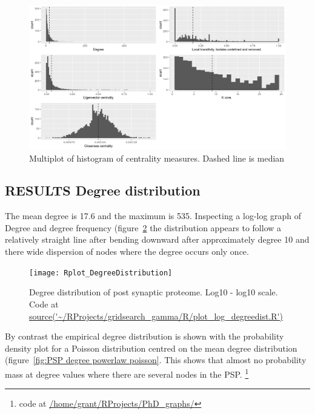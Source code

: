 \begin{figure}
    \centering
    \includegraphics[width=\textwidth]{images/Rplot_histogram_centralities.png}
    \caption{Multiplot of histogram of centrality measures. Dashed line is median}
    \label{fig:multiplot centralities}
\end{figure}

\subsection{RESULTS Degree distribution}

The mean degree is 17.6 and the maximum is 535. Inspecting a log-log graph of Degree and degree frequency (figure~\ref{fig:Degree distribution of post synaptic proteome. Log10 - log10 scale.} the distribution appears to follow a relatively straight line after bending downward after approximately degree 10 and there wide dispersion of nodes where the degree occurs only once.

\begin{figure}
    \texttt{[image: Rplot\_DegreeDistribution]}
    \caption{Degree distribution of post synaptic proteome. Log10 - log10 scale. Code at \url{source('~/RProjects/gridsearch_gamma/R/plot_log_degreedist.R') }}
    \label{fig:Degree distribution of post synaptic proteome. Log10 - log10 scale.}
\end{figure}
By contrast the empirical degree distribution is shown with the probability density plot for a Poisson distribution centred on the mean degree distribution (figure~\ref{fig:PSP degree powerlaw poisson}. This shows that almost no probability mass at degree values where there are several nodes in the PSP.
\footnote{code at \url{/home/grant/RProjects/PhD_graphs/}}

